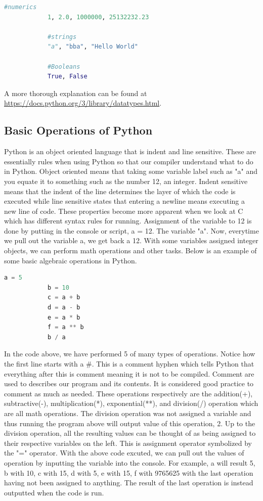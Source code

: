 \documentclass[11pt,a4paper]{book}
\begin{document}
			\begin{lstlisting}[language=Python]
			#numerics
			1, 2.0, 1000000, 25132232.23
			
			#strings
			"a", "bba", "Hello World"
			
			#Booleans
			True, False
			\end{lstlisting}
			
			A more thorough explanation can be found at \url{https://docs.python.org/3/library/datatypes.html}.
		\subsection{Basic Operations of Python}
			\label{subsec: Basic Operations of Python}
			Python is an object oriented language that is indent and line sensitive. These are essentially rules when using Python so that our compiler understand what to do in Python. Object oriented means that taking some variable label such as "a" and you equate it to something such as the number 12, an integer. Indent sensitive means that the indent of the line determines the layer of which the code is executed while line sensitive states that entering a newline means executing a new line of code. These properties become more apparent when we look at C which has different syntax rules for running.  Assignment of the variable to 12 is done by putting in the console or script, a = 12. The variable "a". Now, everytime we pull out the variable a, we get back a 12. With some variables assigned integer objects, we can perform math operations and other tasks. Below is an example of some basic algebraic operations in Python.
			
			\begin{lstlisting}[language=Python, caption=Data types and assignment example]
			a = 5
			b = 10
			c = a + b
			d = a - b
			e = a * b
			f = a ** b
			b / a
			\end{lstlisting}
			
			In the code above, we have performed 5 of many types of operations. Notice how the first line starts with a \#. This is a comment hyphen which tells Python that everything after this is comment meaning it is not to be compiled. Comment are used to describes our program and its contents. It is considered good practice to comment as much as needed. These operations respectively are the addition(+), subtractive(-), multiplication(*), exponential(**), and division(/) operation which are all math operations. The division operation was not assigned a variable and thus running the program above will output value of this operation, 2. Up to the division operation, all the resulting values can be thought of as being assigned to their respective variables on the left. This is assignment operator symbolized by the "=" operator. With the above code excuted, we can pull out the values of operation by inputting the variable into the console. For example, a will result 5, b with 10, c with 15, d with 5, e with 15, f with 9765625 with the last operation having not been assigned to anything. The result of the last operation is  instead outputted when the code is run.
			
\end{document}
